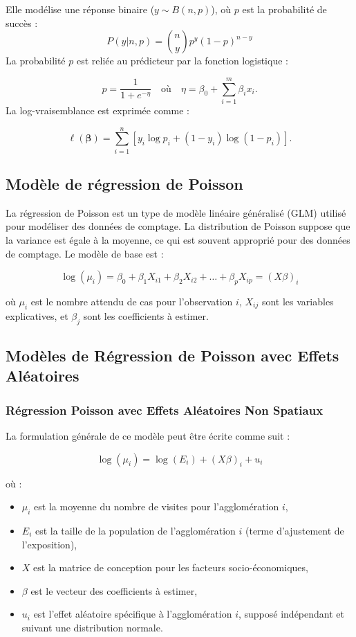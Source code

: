 \documentclass[
]{article}
\providecommand{\tightlist}{%
  \setlength{\itemsep}{0pt}\setlength{\parskip}{0pt}}
\begin{document}
Elle modélise une réponse binaire (\(y \sim B(n, p)\)), où \(p\) est la
probabilité de succès : \[
P(y | n, p) = \binom{n}{y} p^y (1-p)^{n-y}
\] La probabilité \(p\) est reliée au prédicteur par la fonction
logistique :

\[
p = \frac{1}{1 + e^{-\eta}} \quad \text{où} \quad \eta = \beta_0 + \sum_{i=1}^m \beta_i x_i.
\] La log-vraisemblance est exprimée comme :

\[
\ell(\boldsymbol{\beta}) = \sum_{i=1}^n \left[ y_i \log{p_i} + (1-y_i) \log{(1-p_i)} \right].
\]

\subsection{Modèle de régression de
Poisson}\label{moduxe8le-de-ruxe9gression-de-poisson}

La régression de Poisson est un type de modèle linéaire généralisé (GLM)
utilisé pour modéliser des données de comptage. La distribution de
Poisson suppose que la variance est égale à la moyenne, ce qui est
souvent approprié pour des données de comptage. Le modèle de base est :

\[
\log(\mu_i) = \beta_0 + \beta_1 X_{i1} + \beta_2 X_{i2} + \dots + \beta_p X_{ip} = (X\beta)_i
\]

où \(\mu_i\) est le nombre attendu de cas pour l'observation \(i\),
\(X_{ij}\) sont les variables explicatives, et \(\beta_j\) sont les
coefficients à estimer.

\subsection{Modèles de Régression de Poisson avec Effets
Aléatoires}\label{moduxe8les-de-ruxe9gression-de-poisson-avec-effets-aluxe9atoires}

\subsubsection{Régression Poisson avec Effets Aléatoires Non
Spatiaux}\label{ruxe9gression-poisson-avec-effets-aluxe9atoires-non-spatiaux}

La formulation générale de ce modèle peut être écrite comme suit :

\[
\log(\mu_i) = \log(E_i) + (X\beta)_i + u_i
\]

où :

\begin{itemize}
\tightlist
\item
  \(\mu_i\) est la moyenne du nombre de visites pour l'agglomération
  \(i\),
\item
  \(E_i\) est la taille de la population de l'agglomération \(i\) (terme
  d'ajustement de l'exposition),
\item
  \(X\) est la matrice de conception pour les facteurs
  socio-économiques,
\item
  \(\beta\) est le vecteur des coefficients à estimer,
\item
  \(u_i\) est l'effet aléatoire spécifique à l'agglomération \(i\),
  supposé indépendant et suivant une distribution normale.
\end{itemize}
\end{document}
